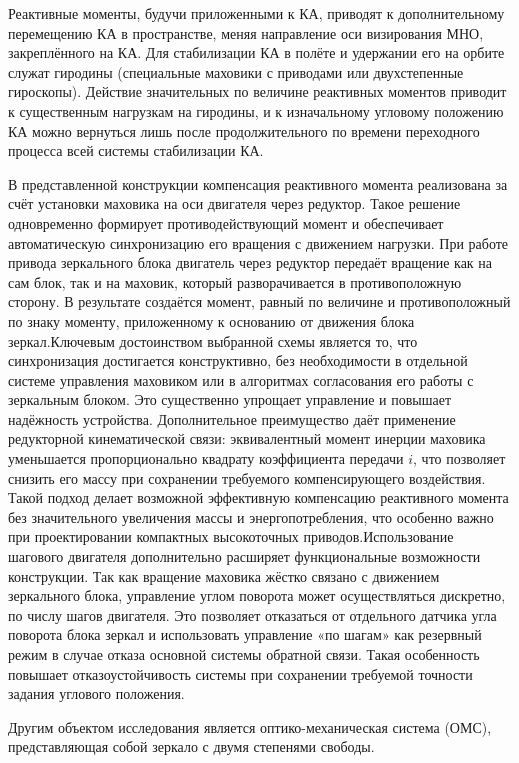 Реактивные моменты, будучи приложенными к КА, приводят к дополнительному перемещению КА в пространстве, меняя направление оси визирования МНО, закреплённого на КА. Для стабилизации КА в полёте и удержании его на орбите служат гиродины (специальные маховики с приводами или двухстепенные гироскопы). Действие значительных по величине реактивных моментов приводит к существенным нагрузкам на гиродины, и к изначальному угловому положению КА можно вернуться лишь после продолжительного по времени переходного процесса всей системы стабилизации КА.\cite{uglova2019gurodin, zhao2023effect}

В представленной конструкции компенсация реактивного момента реализована за счёт установки маховика на оси двигателя через редуктор. Такое решение одновременно формирует противодействующий момент и обеспечивает автоматическую синхронизацию его вращения с движением нагрузки. При работе привода зеркального блока двигатель через редуктор передаёт вращение как на сам блок, так и на маховик, который разворачивается в противоположную сторону. В результате создаётся момент, равный по величине и противоположный по знаку моменту, приложенному к основанию от движения блока зеркал.Ключевым достоинством выбранной схемы является то, что синхронизация достигается конструктивно, без необходимости в отдельной системе управления маховиком или в алгоритмах согласования его работы с зеркальным блоком. Это существенно упрощает управление и повышает надёжность устройства. Дополнительное преимущество даёт применение редукторной кинематической связи: эквивалентный момент инерции маховика уменьшается пропорционально квадрату коэффициента передачи $i$, что позволяет снизить его массу при сохранении требуемого компенсирующего воздействия. Такой подход делает возможной эффективную компенсацию реактивного момента без значительного увеличения массы и энергопотребления, что особенно важно при проектировании компактных высокоточных приводов.Использование шагового двигателя дополнительно расширяет функциональные возможности конструкции. Так как вращение маховика жёстко связано с движением зеркального блока, управление углом поворота может осуществляться дискретно, по числу шагов двигателя. Это позволяет отказаться от отдельного датчика угла поворота блока зеркал и использовать управление «по шагам» как резервный режим в случае отказа основной системы обратной связи. Такая особенность повышает отказоустойчивость системы при сохранении требуемой точности задания углового положения.

Другим объектом исследования является оптико-механическая система (ОМС), представляющая собой зеркало с двумя степенями свободы.

